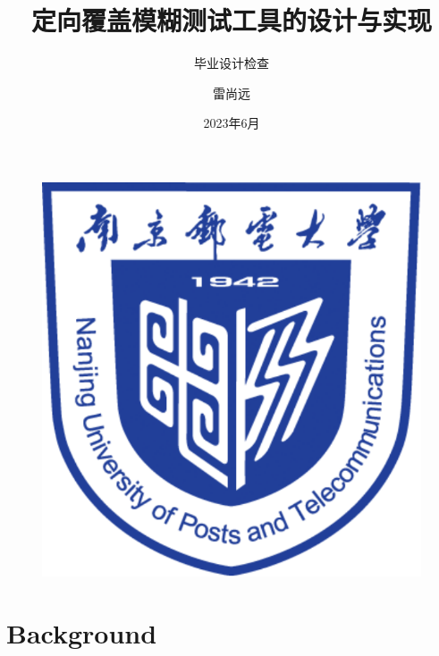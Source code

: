 \documentclass[10pt,aspectratio=43]{beamer}
\author{雷尚远}
\title{定向覆盖模糊测试工具的设计与实现}
\subtitle{毕业设计检查}
\institute{南京邮电大学计算机学院}
\date{2023年6月}
\begin{document}
\begin{frame}
    \titlepage
    \begin{figure}[htpb]
        \begin{center}
            \includegraphics[width=0.2\linewidth]{pic/NJUPT_Logo.pdf}
        \end{center}
    \end{figure}
\end{frame}

\begin{frame}
    \tableofcontents[sectionstyle=show,subsectionstyle=show/shaded/hide,subsubsectionstyle=show/shaded/hide]
\end{frame}


\section{Background}
\end{document}
